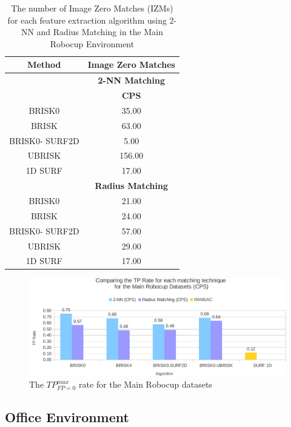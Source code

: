 \begin{table}
\centering
\caption{The number of Image Zero Matches (IZMs) for each feature extraction
algorithm using 2-NN and Radius Matching in the Main Robocup Environment}
\begin{tabular}{|c|c|}
\hline 
\textbf{Method} & \multicolumn{1}{c|}{\textbf{Image Zero Matches}}\tabularnewline
\hline 
 & \multicolumn{1}{c|}{\textbf{2-NN Matching}}\tabularnewline
\hline 
 & \textbf{CPS}\tabularnewline
\hline 
\hline 
BRISK0 & 35.00\tabularnewline
\hline 
BRISK & 63.00\tabularnewline
\hline 
BRISK0- SURF2D & 5.00\tabularnewline
\hline 
UBRISK & 156.00\tabularnewline
\hline 
1D SURF & 17.00\tabularnewline
\hline 
 & \multicolumn{1}{c|}{\textbf{Radius Matching}}\tabularnewline
\hline 
BRISK0 & 21.00\tabularnewline
\hline 
BRISK & 24.00\tabularnewline
\hline 
BRISK0- SURF2D & 57.00\tabularnewline
\hline 
UBRISK & 29.00\tabularnewline
\hline 
1D SURF & 17.00\tabularnewline
\hline 
\end{tabular}
\label{app:mrd_izm}
\end{table}

\begin{figure}
  \centering
    \includegraphics[width=1.0\textwidth]{../Drawings/Graphs/tp_rate_mrb_cps.pdf}
    \caption{The $TP_{FP=0}^{max}$ rate for the Main Robocup datasets} 
    \label{app:tp_rate_mrd}
\end{figure}



\subsection{Office Environment}
\label{app:oe}

